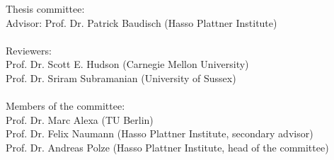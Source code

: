Thesis committee:
\\
Advisor: Prof. Dr. Patrick Baudisch (Hasso Plattner Institute) \\
\\
Reviewers: \\
Prof. Dr. Scott E. Hudson (Carnegie Mellon University) \\
Prof. Dr. Sriram Subramanian (University of Sussex) \\
\\
Members of the committee: \\
Prof. Dr. Marc Alexa (TU Berlin) \\
Prof. Dr. Felix Naumann (Hasso Plattner Institute, secondary advisor) \\
Prof. Dr. Andreas Polze (Hasso Plattner Institute, head of the committee) \\